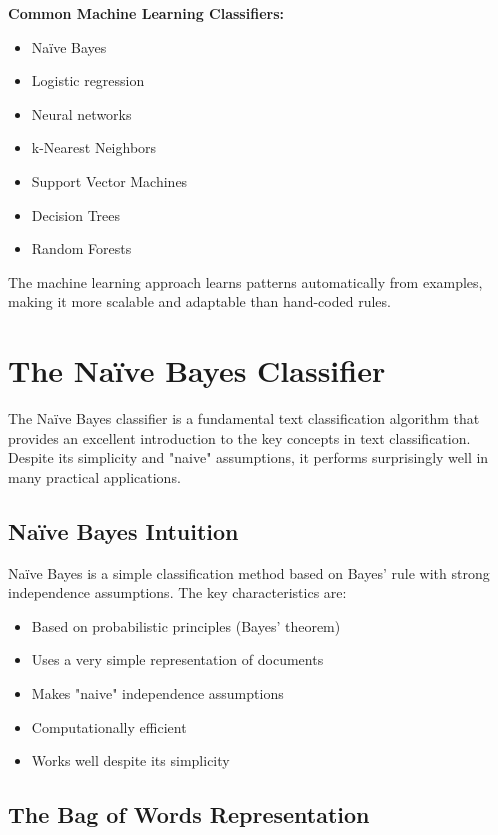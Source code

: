 \documentclass[11pt,a4paper]{article}
\theoremstyle{definition}
\theoremstyle{plain}
\theoremstyle{remark}
\begin{document}
\textbf{Common Machine Learning Classifiers:}
\begin{itemize}
    \item Naïve Bayes
    \item Logistic regression
    \item Neural networks
    \item k-Nearest Neighbors
    \item Support Vector Machines
    \item Decision Trees
    \item Random Forests
\end{itemize}

The machine learning approach learns patterns automatically from examples, making it more scalable and adaptable than hand-coded rules.

\section{The Naïve Bayes Classifier}

The Naïve Bayes classifier is a fundamental text classification algorithm that provides an excellent introduction to the key concepts in text classification. Despite its simplicity and "naive" assumptions, it performs surprisingly well in many practical applications.

\subsection{Naïve Bayes Intuition}

Naïve Bayes is a simple classification method based on Bayes' rule with strong independence assumptions. The key characteristics are:

\begin{itemize}
    \item Based on probabilistic principles (Bayes' theorem)
    \item Uses a very simple representation of documents
    \item Makes "naive" independence assumptions
    \item Computationally efficient
    \item Works well despite its simplicity
\end{itemize}

\subsection{The Bag of Words Representation}
\end{document}
